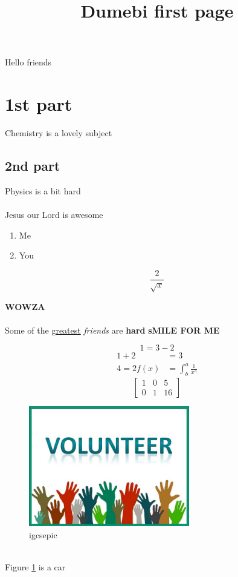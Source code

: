 \documentclass[landscape]{article}
\begin{document}
	\title{Dumebi first page}
	\maketitle
	Hello friends
	\section{1st part}
		Chemistry is a lovely subject
		\subsection{2nd part}
			Physics is a bit hard
			
			\paragraph{}
				Jesus our Lord is awesome
				
				\begin{enumerate}
					\item Me
					\item You
				\end{enumerate}
			
			\begin{equation}
				\frac{2}{\sqrt{x}}
			\end{equation}
	
	\textbf{WOWZA}
	\paragraph{}
		Some of the \underline{greatest} \emph{friends} are \textbf{hard} \textbf{sMILE FOR ME}
		
		\newpage
		
		\begin{equation*}
			1= 3 - 2
		\end{equation*}
		\begin{align*}
			1+2 &=3\\
			4=2
			f(x) &= \int^a_b
			\frac{1}{x^3}			
		\end{align*}
	\begin{equation*}
		\left[
		\begin{matrix}
			1 & 0 & 5\\ 0 & 1 & 16
		\end{matrix}
			\right]
	\end{equation*}
	\begin{figure}[h!]
		\includegraphics[width= 7cm]{J218VOLUNTEER.jpg}
		\caption{igcsepic}
		\label{fig: volunteer}
		
	\end{figure}\\
	Figure \ref{fig: volunteer} is a car
	
\end{document}
